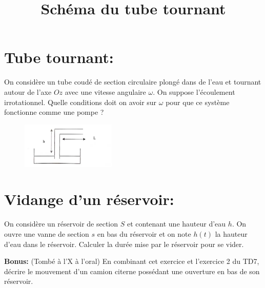 \documentclass{article}
\begin{document}
    \section{Tube tournant:} 
    On considère un tube coudé de section circulaire plongé dans de l'eau et tournant autour de l'axe $Oz$ avec une vitesse angulaire $\omega$.
    On suppose l'écoulement irrotationnel.
    Quelle conditions doit on avoir sur $\omega$ pour que ce système fonctionne comme une pompe ? 

    \begin{figure}[h]
        \centering
        \includegraphics[width=0.4\textwidth]{tube_tournant.png}
        \label{fig:image1}
        \title{Schéma du tube tournant}

      \end{figure}

\section{Vidange d'un réservoir:}

On considère un réservoir de section $S$ et contenant une hauteur d'eau $h$. 
On ouvre une vanne de section $s$ en bas du réservoir et on note $h(t)$ la hauteur d'eau dans le réservoir.
Calculer la durée mise par le réservoir pour se vider. 

\textbf{Bonus: } (Tombé à l'X à l'oral) En combinant cet exercice et l'exercice 2 du TD7, décrire le mouvement d'un camion citerne possédant une ouverture en bas de son réservoir.
        
\end{document}
